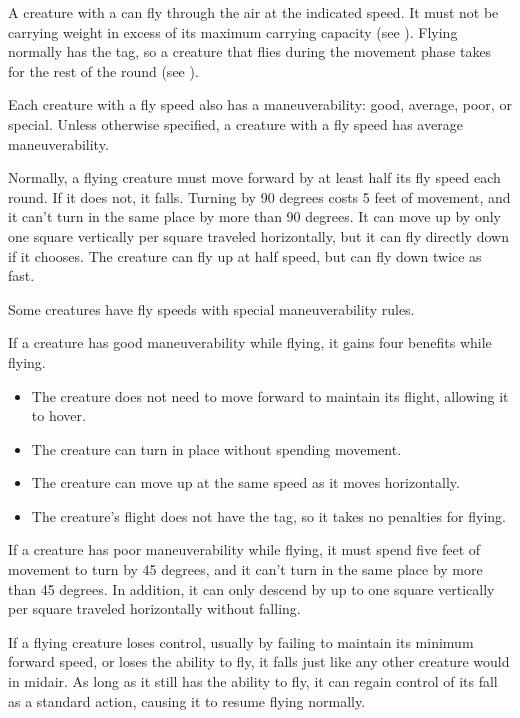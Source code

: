         \label{Flying}
        A creature with a  can fly through the air at the indicated speed.
        It must not be carrying weight in excess of its maximum carrying capacity (see ).
        Flying normally has the  tag, so a creature that flies during the movement phase takes  for the rest of the round (see ).

        Each creature with a fly speed also has a maneuverability: good, average, poor, or special.
        Unless otherwise specified, a creature with a fly speed has average maneuverability.

        Normally, a flying creature must move forward by at least half its fly speed each round. If it does not, it falls.
        Turning by 90 degrees costs 5 feet of movement, and it can't turn in the same place by more than 90 degrees.
        It can move up by only one square vertically per square traveled horizontally, but it can fly directly down if it chooses.
        The creature can fly up at half speed, but can fly down twice as fast.

        \label{Maneuverability} Some creatures have fly speeds with special maneuverability rules.

         If a creature has good maneuverability while flying, it gains four benefits while flying.
        \begin{itemize}
            \item The creature does not need to move forward to maintain its flight, allowing it to hover.
            \item The creature can turn in place without spending movement.
            \item The creature can move up at the same speed as it moves horizontally.
            \item The creature's flight does not have the  tag, so it takes no penalties for flying.
        \end{itemize}

         If a creature has poor maneuverability while flying, it must spend five feet of movement to turn by 45 degrees, and it can't turn in the same place by more than 45 degrees. In addition, it can only descend by up to one square vertically per square traveled horizontally without falling.

         If a flying creature loses control, usually by failing to maintain its minimum forward speed, or loses the ability to fly, it falls just like any other creature would in midair. As long as it still has the ability to fly, it can regain control of its fall as a standard action, causing it to resume flying normally.

